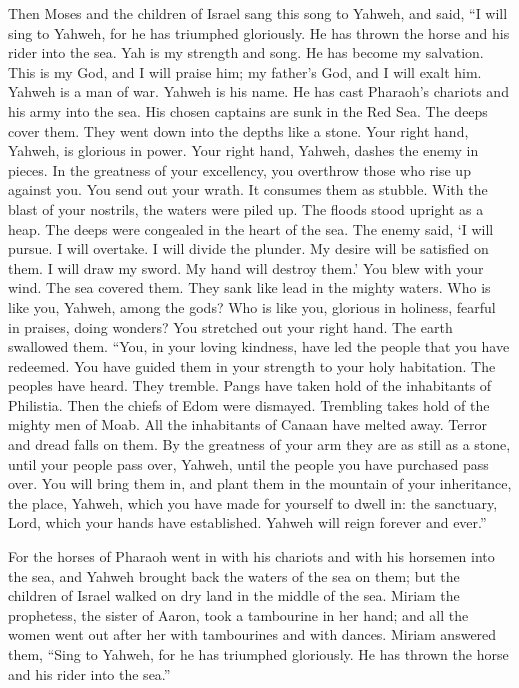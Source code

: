  Then Moses and the children of Israel sang this song to
Yahweh, and said, ``I will sing to Yahweh, for he has triumphed
gloriously. He has thrown the horse and his rider into the sea.
 Yah is my strength and song. He has become my salvation.
This is my God, and I will praise him; my father's God, and I will exalt
him.  Yahweh is a man of war. Yahweh is his name.
 He has cast Pharaoh's chariots and his army into the sea.
His chosen captains are sunk in the Red Sea.  The deeps
cover them. They went down into the depths like a stone. 
Your right hand, Yahweh, is glorious in power. Your right hand, Yahweh,
dashes the enemy in pieces.  In the greatness of your
excellency, you overthrow those who rise up against you. You send out
your wrath. It consumes them as stubble.  With the blast
of your nostrils, the waters were piled up. The floods stood upright as
a heap. The deeps were congealed in the heart of the sea. 
The enemy said, `I will pursue. I will overtake. I will divide the
plunder. My desire will be satisfied on them. I will draw my sword. My
hand will destroy them.'  You blew with your wind. The
sea covered them. They sank like lead in the mighty waters.
 Who is like you, Yahweh, among the gods? Who is like
you, glorious in holiness, fearful in praises, doing wonders?
 You stretched out your right hand. The earth swallowed
them.  ``You, in your loving kindness, have led the
people that you have redeemed. You have guided them in your strength to
your holy habitation.  The peoples have heard. They
tremble. Pangs have taken hold of the inhabitants of Philistia.
 Then the chiefs of Edom were dismayed. Trembling takes
hold of the mighty men of Moab. All the inhabitants of Canaan have
melted away.  Terror and dread falls on them. By the
greatness of your arm they are as still as a stone, until your people
pass over, Yahweh, until the people you have purchased pass over.
 You will bring them in, and plant them in the mountain
of your inheritance, the place, Yahweh, which you have made for yourself
to dwell in: the sanctuary, Lord, which your hands have established.
 Yahweh will reign forever and ever.''

 For the horses of Pharaoh went in with his chariots and
with his horsemen into the sea, and Yahweh brought back the waters of
the sea on them; but the children of Israel walked on dry land in the
middle of the sea.  Miriam the prophetess, the sister of
Aaron, took a tambourine in her hand; and all the women went out after
her with tambourines and with dances.  Miriam answered
them, ``Sing to Yahweh, for he has triumphed gloriously. He has thrown
the horse and his rider into the sea.''

